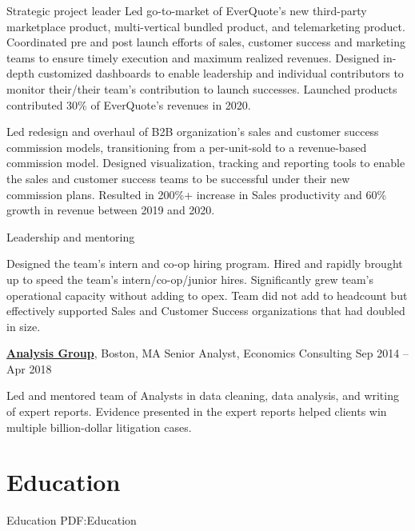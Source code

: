 \documentclass[letterpaper,10pt,oneside]{article}
\begin{document}
\begin{body}
\begin{flushleft}
\BulletItem Strategic project leader
\vspace{0.5em} \SubBulletItem Led go-to-market of EverQuote's new third-party marketplace product, multi-vertical bundled product, and telemarketing product. Coordinated pre and post launch efforts of sales, customer success and marketing teams to ensure timely execution and maximum realized revenues. Designed in-depth customized dashboards to enable leadership and individual contributors to monitor their/their team's contribution to launch successes. Launched products contributed 30\% of EverQuote's revenues in 2020.

\vspace{0.5em} \SubBulletItem Led redesign and overhaul of B2B organization's sales and customer success commission models, transitioning from a per-unit-sold to a revenue-based commission model. Designed visualization, tracking and reporting tools to enable the sales and customer success teams to be successful under their new commission plans. Resulted in 200\%+ increase in Sales productivity and 60\% growth in revenue between 2019 and 2020.

\vspace{0.75em}
\BulletItem Leadership and mentoring

\vspace{0.5em} \SubBulletItem Designed the team's intern and co-op hiring program. Hired and rapidly brought up to speed the team's intern/co-op/junior hires. Significantly grew team's operational capacity without adding to opex. Team did not add to headcount but effectively supported Sales and Customer Success organizations that had doubled in size.

\end{flushleft}

\vspace{0.75em}
\href{http://www.analysisgroup.com/}
{\textbf{Analysis Group}},
Boston, MA
\GapNoBreak
Senior Analyst,
Economics Consulting
\hfill
Sep 2014 --
Apr 2018
\begin{flushleft}

\BulletItem Led and mentored team of Analysts in data cleaning, data analysis, and writing of expert reports. Evidence presented in the expert reports helped clients win multiple billion-dollar litigation cases.

\end{flushleft}


\section
{Education}
{Education}
{PDF:Education}


\end{body}
\end{document}
